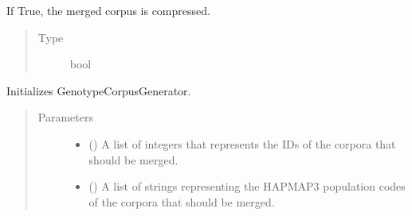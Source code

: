 \documentclass[a4paper,10pt,english]{sphinxhowto}
\begin{document}
\begin{fulllineitems}
\begin{fulllineitems}
\begin{quote}
\begin{description}
\end{description}\end{quote}

\end{fulllineitems}


\begin{fulllineitems}
\label{\detokenize{utils:utils.genotype_corpus_merger.GenotypeCorpusMerger.compress}}
If True, the merged corpus is compressed.
\begin{quote}\begin{description}
\item[{Type}] \leavevmode
bool

\end{description}\end{quote}

\end{fulllineitems}


\begin{fulllineitems}
\label{\detokenize{utils:utils.genotype_corpus_merger.GenotypeCorpusMerger.__init__}}
Initializes GenotypeCorpusGenerator.
\begin{quote}\begin{description}
\item[{Parameters}] \leavevmode\begin{itemize}
\item {} 
 () \textendash{} A list of integers that represents the IDs of the corpora that should be merged.

\item {} 
 () \textendash{} A list of strings representing the HAPMAP3 population codes of the corpora that should be merged.


\end{itemize}
\end{description}
\end{quote}
\end{fulllineitems}
\end{fulllineitems}
\end{document}
